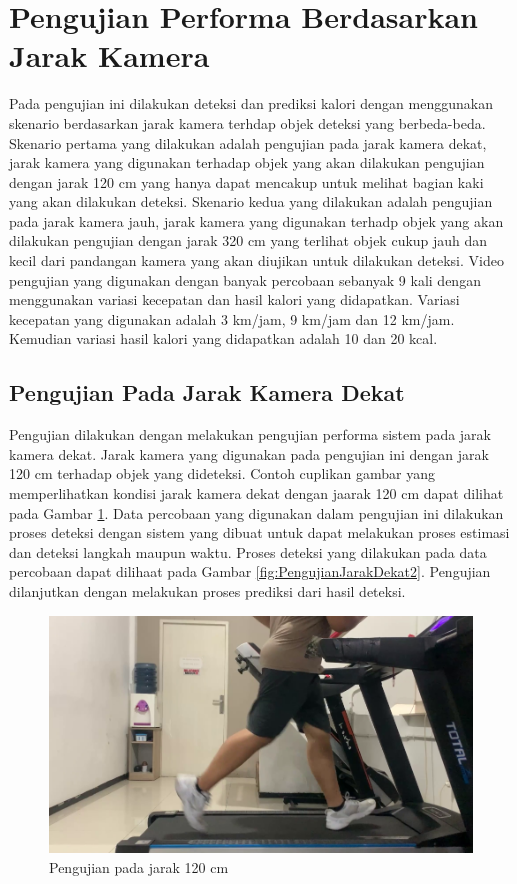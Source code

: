 \section{Pengujian Performa Berdasarkan Jarak Kamera}
\label{sec:PengujianJarak}

Pada pengujian ini dilakukan deteksi dan prediksi kalori dengan menggunakan skenario berdasarkan jarak kamera terhdap objek deteksi yang berbeda-beda. Skenario pertama yang dilakukan adalah pengujian pada jarak kamera dekat, jarak kamera yang digunakan terhadap objek yang akan dilakukan pengujian dengan jarak 120 cm yang hanya dapat mencakup untuk melihat bagian kaki yang akan dilakukan deteksi. Skenario kedua yang dilakukan adalah pengujian pada jarak kamera jauh, jarak kamera yang digunakan terhadp objek yang akan dilakukan pengujian dengan jarak 320 cm yang terlihat objek cukup jauh dan kecil dari pandangan kamera yang akan diujikan untuk dilakukan deteksi. Video pengujian yang digunakan dengan banyak percobaan sebanyak 9 kali dengan menggunakan variasi kecepatan dan hasil kalori yang didapatkan. Variasi kecepatan yang digunakan adalah 3 km/jam, 9 km/jam dan 12 km/jam. Kemudian variasi hasil kalori yang didapatkan adalah 10 dan 20 kcal. 

\subsection{Pengujian Pada Jarak Kamera Dekat}
\label{subsec:PengujianJarakDekat}

Pengujian dilakukan dengan melakukan pengujian performa sistem pada jarak kamera dekat. Jarak kamera yang digunakan pada pengujian ini dengan jarak 120 cm terhadap objek yang dideteksi. Contoh cuplikan gambar yang memperlihatkan kondisi jarak kamera dekat dengan jaarak 120 cm dapat dilihat pada Gambar \ref{fig:PengujianJarakDekat}. Data percobaan yang digunakan dalam pengujian ini dilakukan proses deteksi dengan sistem yang dibuat untuk dapat melakukan proses estimasi dan deteksi langkah maupun waktu. Proses deteksi yang dilakukan pada data percobaan dapat dilihaat pada Gambar \ref{fig:PengujianJarakDekat2}. Pengujian dilanjutkan dengan melakukan proses prediksi dari hasil deteksi.

\begin{figure}[H]
  \centering
  \includegraphics[scale=0.42]{gambar/jarak_dekat.png}
  \caption{Pengujian pada jarak 120 cm}
  \label{fig:PengujianJarakDekat}
\end{figure}

